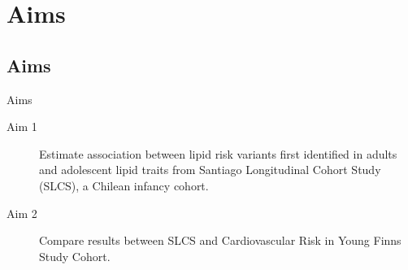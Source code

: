 \documentclass[pdf]{beamer}\usepackage[]{graphicx}\usepackage[]{color}
\begin{document}

\section{Aims}
\subsection{Aims}

\begin{frame}{Aims}
        \begin{description}
            \item[Aim 1] Estimate association between lipid risk variants first identified in adults and adolescent lipid traits from Santiago Longitudinal Cohort Study (SLCS), a Chilean infancy cohort.
            \item[Aim 2] Compare results between SLCS and Cardiovascular Risk in Young Finns Study Cohort.
            \end{description}

        \end{frame}
\end{document}
